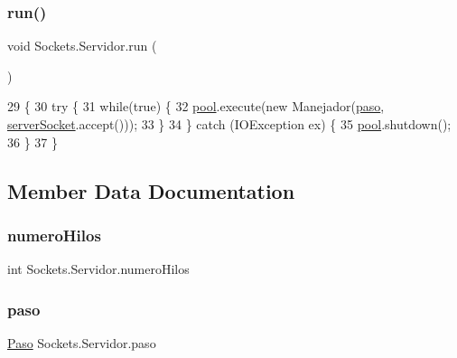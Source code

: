 \subsubsection{\texorpdfstring{run()}{run()}}
{\footnotesize\ttfamily void Sockets.\+Servidor.\+run (\begin{DoxyParamCaption}{ }\end{DoxyParamCaption})\hspace{0.3cm}{\ttfamily [inline]}}


\begin{DoxyCode}
29                       \{
30       \textcolor{keywordflow}{try} \{
31         \textcolor{keywordflow}{while}(\textcolor{keyword}{true}) \{
32           \mbox{\hyperlink{class_sockets_1_1_servidor_a1a2e8bae5883a358083c35093a2a74b3}{pool}}.execute(\textcolor{keyword}{new} Manejador(\mbox{\hyperlink{class_sockets_1_1_servidor_ae795e6902937973b50d977b2ed77b470}{paso}}, \mbox{\hyperlink{class_sockets_1_1_servidor_aa6eba116bcc543fa6b532894a6402957}{serverSocket}}.accept()));
33         \}
34       \} \textcolor{keywordflow}{catch} (IOException ex) \{
35           \mbox{\hyperlink{class_sockets_1_1_servidor_a1a2e8bae5883a358083c35093a2a74b3}{pool}}.shutdown();
36       \}
37     \}
\end{DoxyCode}


\subsection{Member Data Documentation}
\mbox{\label{class_sockets_1_1_servidor_a691693d40a5185891964aea68f2e01c7}} 
\subsubsection{\texorpdfstring{numero\+Hilos}{numeroHilos}}
{\footnotesize\ttfamily int Sockets.\+Servidor.\+numero\+Hilos\hspace{0.3cm}{\ttfamily [package]}}

\mbox{\label{class_sockets_1_1_servidor_ae795e6902937973b50d977b2ed77b470}} 
\subsubsection{\texorpdfstring{paso}{paso}}
{\footnotesize\ttfamily \mbox{\hyperlink{class_sockets_1_1_paso}{Paso}} Sockets.\+Servidor.\+paso\hspace{0.3cm}{\ttfamily [private]}}

